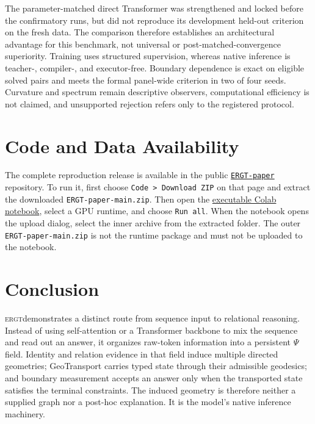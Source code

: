 \documentclass[11pt]{article}
\newcommand{\ERGT}{\textsc{ergt}}
\begin{document}
The parameter-matched direct Transformer was strengthened and locked before the
confirmatory runs, but did not reproduce its development held-out criterion on
the fresh data. The comparison therefore establishes an architectural advantage
for this benchmark, not universal or post-matched-convergence superiority.
Training uses structured supervision, whereas native inference is teacher-,
compiler-, and executor-free. Boundary dependence is exact on eligible solved
pairs and meets the formal panel-wide criterion in two of four seeds. Curvature
and spectrum remain descriptive observers, computational efficiency is not
claimed, and unsupported rejection refers only to the registered protocol.

\section{Code and Data Availability}

The complete reproduction release is available in the public
\href{https://github.com/jalaljafari2009/ERGT-paper}{\texttt{ERGT-paper}}
repository. To run it, first choose \texttt{Code > Download ZIP} on that page
and extract the downloaded \texttt{ERGT-paper-main.zip}. Then open the
\href{https://colab.research.google.com/github/jalaljafari2009/ERGT-paper/blob/main/notebook/ERGT_Attention_Free_Geometric_Reasoning_Study.ipynb}{executable Colab notebook},
select a GPU runtime, and choose \texttt{Run all}. When the notebook opens the
upload dialog, select the inner archive
 from the extracted
folder. The outer \texttt{ERGT-paper-main.zip} is not the runtime package and
must not be uploaded to the notebook.

\section{Conclusion}

\ERGT demonstrates a distinct route from sequence input to relational
reasoning. Instead of using self-attention or a Transformer backbone to mix the
sequence and read out an answer, it organizes raw-token information into a
persistent $\Psi$ field. Identity and relation evidence in that field induce
multiple directed geometries; GeoTransport carries typed state through their
admissible geodesics; and boundary measurement accepts an answer only when the
transported state satisfies the terminal constraints. The induced geometry is
therefore neither a supplied graph nor a post-hoc explanation. It is the
model's native inference machinery.
\end{document}
